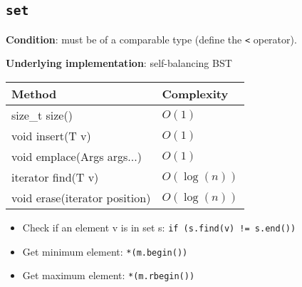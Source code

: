   \subsection{\lstinline{set}}
  \par \textbf{Condition}: must be of a comparable type (define the \lstinline{<} operator).
  \par \textbf{Underlying implementation}: self-balancing BST
  \begin{table}[H]
    \begin{tabular}{|l|l|}
    \hline
    \textbf{Method}      & \textbf{Complexity}      \\ \hline
    size\_t size()                   & $O(1)$          \\ \hline
    void insert(T v)                 & $O(1)$          \\ \hline
    void emplace(Args args...)       & $O(1)$          \\ \hline
    iterator find(T v)               & $O(\log(n))$    \\ \hline
    void erase(iterator position)    & $O(\log(n))$    \\ \hline
    \end{tabular}
  \end{table}
  \begin{itemize}
    \item Check if an element v is in set s: \lstinline{if (s.find(v) != s.end())}
    \item Get minimum element: \lstinline{*(m.begin())}
    \item Get maximum element: \lstinline{*(m.rbegin())}
  \end{itemize}

